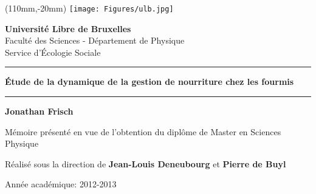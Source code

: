 \begin{titlingpage}




\begin{textblock*}{3cm}(110mm,-20mm)
\texttt{[image: Figures/ulb.jpg]}
\end{textblock*} 


	
  \begin{center}
    {\LARGE \textbf{Universit{\'e} Libre de Bruxelles} \\ }
    \bigskip
    {\Large Faculté des Sciences - Département de Physique\\}
    \bigskip
    {\Large Service d'Écologie Sociale\\}
  \end{center}
\bigskip


  \begin{center}
    \rule{\linewidth}{1pt}\par\vskip 6pt%
    {\huge \textbf{Étude de la dynamique de la gestion de nourriture chez les fourmis}}
    \rule{\linewidth}{1pt}\par\vskip 6pt%

    \bigskip
    {\Large \textbf{Jonathan Frisch}}
    \bigskip
  \end{center}


  \begin{center}

    {\large Mémoire présenté en vue de l'obtention du diplôme de Master en Sciences Physique\\}
    \bigskip
    \bigskip

    {\large Réalisé sous la direction de \textbf{Jean-Louis Deneubourg} et \textbf{Pierre de Buyl}
      }
  \end{center}
  \bigskip




  \begin{center}
    {\large Année académique: 2012-2013}
  \end{center}
  
  

\end{titlingpage}